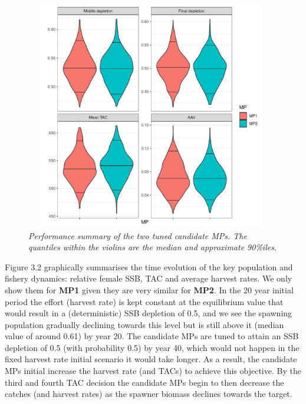 \documentclass[12pt,a4paper,twoside,times,sky,standard]{csiroreport2017}
\begin{document}
\begin{figure}[hb]
    \begin{center}
        \includegraphics[width=11cm,height=10cm]{figs/fixedh_mpcomp.pdf}
    \end{center}
    \caption{\textit{Performance summary of the two tuned candidate MPs. The quantiles within the violins are the median and approximate 90\%iles.}}
\end{figure}

Figure 3.2 graphically summarises the time evolution of the key population and fishery dynamics: relative female SSB, TAC and average harvest rates. We only show them for \textbf{MP1} given they are very similar for \textbf{MP2}. In the 20 year initial period the effort (harvest rate) is kept constant at the equilibrium value that would result in a (deterministic) SSB depletion of 0.5, and we see the spawning population gradually declining towards this level but is still above it (median value of around 0.61) by year 20. The candidate MPs are tuned to attain an SSB depletion of 0.5 (with probability 0.5) by year 40, which would not happen in the fixed harvest rate initial scenario it would take longer. As a result, the candidate MPs initial increase the harvest rate (and TACs) to achieve this objective. By the third and fourth TAC decision the candidate MPs begin to then decrease the catches (and harvest rates) as the spawner biomass declines towards the target.
\end{document}
